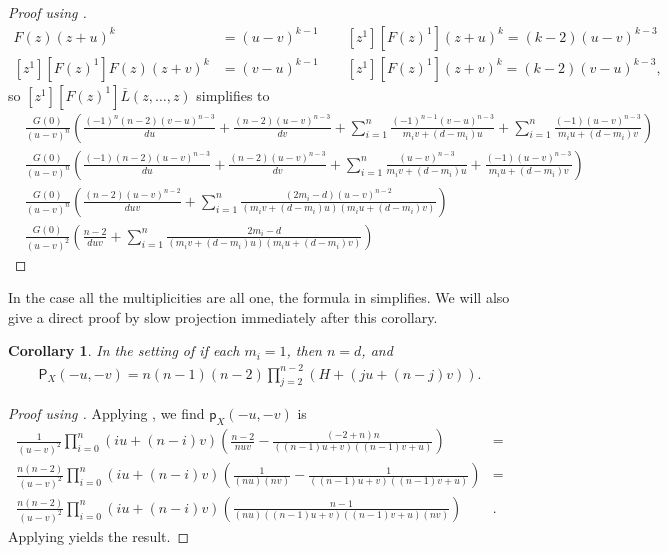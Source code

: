 \documentclass[12 pt, reqno]{amsart}
\newtheorem{cor}[thm]{Corollary}
\theoremstyle{definition}
\newcommand{\p}{\mathsf{p}}
\begin{document}
\begin{proof}[Proof using \cite{FML}]
\begin{align*}
  [z^1][F(z)^1]F(z)(z+u)^k &= (u-v)^{k-1} \qquad [z^1][F(z)^1](z+u)^k=(k-2)(u-v)^{k-3}\\
  [z^1][F(z)^1]F(z)(z+v)^k &= (v-u)^{k-1} \qquad [z^1][F(z)^1](z+v)^k=(k-2)(v-u)^{k-3},    
\end{align*}
so $[z^1][F(z)^1]\overline{L}(z,\ldots,z)$ simplifies to
\begin{align*}
  &\frac{G(0)}{(u-v)^n}\left(\frac{(-1)^n(n-2)(v-u)^{n-3}}{du}+\frac{(n-2)(u-v)^{n-3}}{dv}+\sum_{i=1}^{n}\frac{(-1)^{n-1}(v-u)^{n-3}}{m_iv+(d-m_i)u}+\sum_{i=1}^{n}\frac{(-1)(u-v)^{n-3}}{m_iu+(d-m_i)v}\right)\\
  &\frac{G(0)}{(u-v)^n}\left(\frac{(-1)(n-2)(u-v)^{n-3}}{du}+\frac{(n-2)(u-v)^{n-3}}{dv}+\sum_{i=1}^{n}{\frac{(u-v)^{n-3}}{m_iv+(d-m_i)u}+\frac{(-1)(u-v)^{n-3}}{m_iu+(d-m_i)v}}\right)\\
  &\frac{G(0)}{(u-v)^n}\left(\frac{(n-2)(u-v)^{n-2}}{duv}+\sum_{i=1}^{n}{\frac{(2m_i-d)(u-v)^{n-2}}{(m_iv+(d-m_i)u)(m_iu+(d-m_i)v)}}\right)\\
  &\frac{G(0)}{(u-v)^2}\left(\frac{n-2}{duv}+\sum_{i=1}^{n}{\frac{2m_i-d}{(m_iv+(d-m_i)u)(m_iu+(d-m_i)v)}}\right)
\end{align*}
\end{proof}

In the case all the multiplicities are all one, the formula in
 simplifies. We will also give a direct proof by slow
projection immediately after this corollary.
\begin{cor}
  \label{multiplicityone}
In the setting of  if each $m_i=1$, then $n=d$, and
\begin{align*}
  \mathsf{P}_X(-u,-v) = n(n-1)(n-2)\prod_{j=2}^{n-2}{(H+(ju+(n-j)v))}.
\end{align*}
\end{cor}

\begin{proof}[Proof using ]
  Applying , we find $\p_X(-u,-v)$ is
\begin{align*}
\frac{1}{(u-v)^2}\prod_{i=0}^{n}{(iu+(n-i)v)}\left(\frac{n-2}{nuv}-\frac{(-2+n)n}{((n-1)u+v)((n-1)v+u)}\right)&=\\
\frac{n(n-2)}{(u-v)^2}\prod_{i=0}^{n}{(iu+(n-i)v)}\left(\frac{1}{(nu)(nv)}-\frac{1}{((n-1)u+v)((n-1)v+u)}\right)&=\\
\frac{n(n-2)}{(u-v)^2}\prod_{i=0}^{n}{(iu+(n-i)v)}\left(\frac{n-1}{(nu)((n-1)u+v)((n-1)v+u)(nv)}\right)&.
\end{align*}
Applying \cite[Theorem 6.1]{FNR05} yields the result.
\end{proof}
\end{document}
